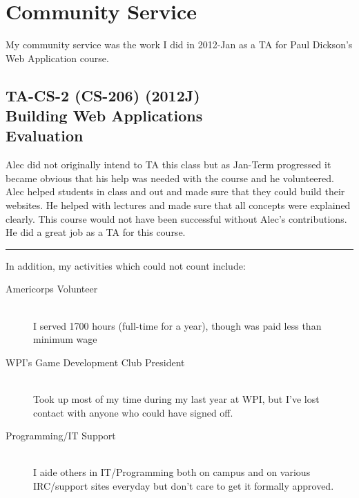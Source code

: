 \chapter{Community Service}

My community service was the work I did in 2012-Jan as a TA for Paul Dickson's Web Application course.

\section*{TA-CS-2 (CS-206) (2012J) \\ Building Web Applications \\ Evaluation}

Alec did not originally intend to TA this class but as Jan-Term
progressed it became obvious that his help was needed with the course
and he volunteered. Alec helped students in class and out and made sure
that they could build their websites. He helped with lectures and made
sure that all concepts were explained clearly. This course would not
have been successful without Alec's contributions. He did a great job as
a TA for this course.


\rule{\textwidth}{1pt}

In addition, my activities which could not count include:

\begin{description}
    \item[Americorps Volunteer] \hfill \\ I served 1700 hours (full-time for a year), though was paid less than minimum wage 
    \item[WPI's Game Development Club President] \hfill \\ Took up most of my time during my last year at WPI, but I've lost contact with anyone who could have signed off. 
    \item[Programming/IT Support] \hfill \\ I aide others in IT/Programming both on campus and on various IRC/support sites everyday but don't care to get it formally approved. 
\end{description}
